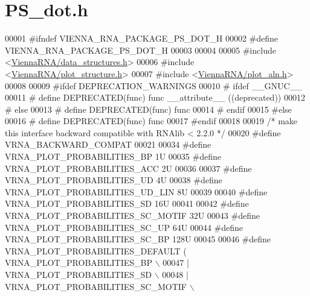 \hypertarget{PS__dot_8h_source}{}\section{P\+S\+\_\+dot.\+h}
\label{PS__dot_8h_source}

\begin{DoxyCode}
00001 \textcolor{preprocessor}{#ifndef VIENNA\_RNA\_PACKAGE\_PS\_DOT\_H}
00002 \textcolor{preprocessor}{#define VIENNA\_RNA\_PACKAGE\_PS\_DOT\_H}
00003 
00004 
00005 \textcolor{preprocessor}{#include <\mbox{\hyperlink{data__structures_8h}{ViennaRNA/data\_structures.h}}>}
00006 \textcolor{preprocessor}{#include <\mbox{\hyperlink{plot__structure_8h}{ViennaRNA/plot\_structure.h}}>}
00007 \textcolor{preprocessor}{#include <\mbox{\hyperlink{plot__aln_8h}{ViennaRNA/plot\_aln.h}}>}
00008 
00009 \textcolor{preprocessor}{#ifdef DEPRECATION\_WARNINGS}
00010 \textcolor{preprocessor}{# ifdef \_\_GNUC\_\_}
00011 \textcolor{preprocessor}{#  define DEPRECATED(func) func \_\_attribute\_\_ ((deprecated))}
00012 \textcolor{preprocessor}{# else}
00013 \textcolor{preprocessor}{#  define DEPRECATED(func) func}
00014 \textcolor{preprocessor}{# endif}
00015 \textcolor{preprocessor}{#else}
00016 \textcolor{preprocessor}{# define DEPRECATED(func) func}
00017 \textcolor{preprocessor}{#endif}
00018 
00019 \textcolor{comment}{/* make this interface backward compatible with RNAlib < 2.2.0 */}
00020 \textcolor{preprocessor}{#define VRNA\_BACKWARD\_COMPAT}
00021 
00034 \textcolor{preprocessor}{#define VRNA\_PLOT\_PROBABILITIES\_BP        1U}
00035 \textcolor{preprocessor}{#define VRNA\_PLOT\_PROBABILITIES\_ACC       2U}
00036 
00037 \textcolor{preprocessor}{#define VRNA\_PLOT\_PROBABILITIES\_UD        4U}
00038 \textcolor{preprocessor}{#define VRNA\_PLOT\_PROBABILITIES\_UD\_LIN    8U}
00039 
00040 \textcolor{preprocessor}{#define VRNA\_PLOT\_PROBABILITIES\_SD        16U}
00041 
00042 \textcolor{preprocessor}{#define VRNA\_PLOT\_PROBABILITIES\_SC\_MOTIF  32U}
00043 \textcolor{preprocessor}{#define VRNA\_PLOT\_PROBABILITIES\_SC\_UP     64U}
00044 \textcolor{preprocessor}{#define VRNA\_PLOT\_PROBABILITIES\_SC\_BP     128U}
00045 
00046 \textcolor{preprocessor}{#define VRNA\_PLOT\_PROBABILITIES\_DEFAULT   (   VRNA\_PLOT\_PROBABILITIES\_BP \(\backslash\)}
00047 \textcolor{preprocessor}{                                            | VRNA\_PLOT\_PROBABILITIES\_SD \(\backslash\)}
00048 \textcolor{preprocessor}{                                            | VRNA\_PLOT\_PROBABILITIES\_SC\_MOTIF \(\backslash\)}

\end{DoxyCode}

